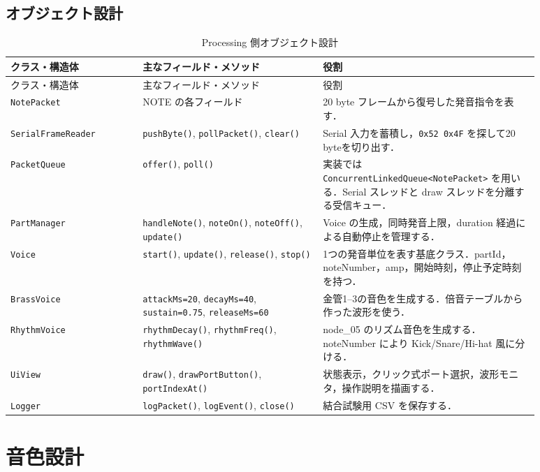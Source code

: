 \documentclass[lualatex,book,openany,paper=a4paper,jafontsize=11.5pt,jafontscale=1.05]{jlreq}
\begin{document}
\subsection{オブジェクト設計}
\begin{longtable}{p{0.22\linewidth}p{0.30\linewidth}p{0.36\linewidth}}
\caption{Processing 側オブジェクト設計}\label{tab:classes}\\
\toprule
クラス・構造体 & 主なフィールド・メソッド & 役割 \\
\midrule
\endfirsthead
\toprule
クラス・構造体 & 主なフィールド・メソッド & 役割 \\
\midrule
\endhead
\texttt{NotePacket} &
NOTE の各フィールド &
20 byte フレームから復号した発音指令を表す． \\
\texttt{SerialFrameReader} &
\texttt{pushByte()}, \texttt{pollPacket()}, \texttt{clear()} &
Serial 入力を蓄積し，\texttt{0x52 0x4F} を探して20 byteを切り出す． \\
\texttt{PacketQueue} &
\texttt{offer()}, \texttt{poll()} &
実装では \texttt{ConcurrentLinkedQueue<NotePacket>} を用いる．Serial スレッドと draw スレッドを分離する受信キュー． \\
\texttt{PartManager} &
\texttt{handleNote()}, \texttt{noteOn()}, \texttt{noteOff()}, \texttt{update()} &
Voice の生成，同時発音上限，duration 経過による自動停止を管理する． \\
\texttt{Voice} &
\texttt{start()}, \texttt{update()}, \texttt{release()}, \texttt{stop()} &
1つの発音単位を表す基底クラス．partId，noteNumber，amp，開始時刻，停止予定時刻を持つ． \\
\texttt{BrassVoice} &
\texttt{attackMs=20}, \texttt{decayMs=40}, \texttt{sustain=0.75}, \texttt{releaseMs=60} &
金管1--3の音色を生成する．倍音テーブルから作った波形を使う． \\
\texttt{RhythmVoice} &
\texttt{rhythmDecay()}, \texttt{rhythmFreq()}, \texttt{rhythmWave()} &
node\_05 のリズム音色を生成する．noteNumber により Kick/Snare/Hi-hat 風に分ける． \\
\texttt{UiView} &
\texttt{draw()}, \texttt{drawPortButton()}, \texttt{portIndexAt()} &
状態表示，クリック式ポート選択，波形モニタ，操作説明を描画する． \\
\texttt{Logger} &
\texttt{logPacket()}, \texttt{logEvent()}, \texttt{close()} &
結合試験用 CSV を保存する． \\
\bottomrule
\end{longtable}

\section{音色設計}
\end{document}
